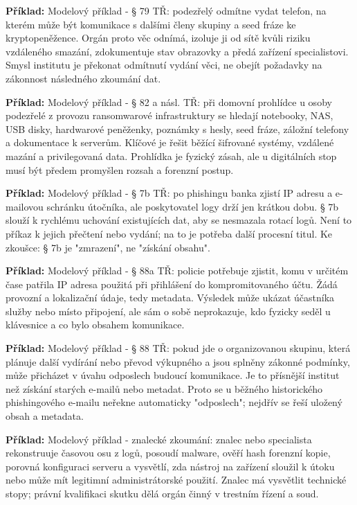 \documentclass[11pt,a4paper]{article}
\newcommand{\priklad}[1]{\begin{tcolorbox}[breakable,enhanced,colback=green!7,colframe=green!30!black,boxrule=0pt,arc=1mm,left=5pt,right=5pt,top=5pt,bottom=5pt,before skip=6pt,after skip=6pt]\textbf{Příklad:} #1\end{tcolorbox}}
\begin{document}
\priklad{Modelový příklad - § 79 TŘ: podezřelý odmítne vydat telefon, na kterém může být komunikace s dalšími členy skupiny a seed fráze ke kryptopeněžence. Orgán proto věc odnímá, izoluje ji od sítě kvůli riziku vzdáleného smazání, zdokumentuje stav obrazovky a předá zařízení specialistovi. Smysl institutu je překonat odmítnutí vydání věci, ne obejít požadavky na zákonnost následného zkoumání dat.}

\priklad{Modelový příklad - § 82 a násl. TŘ: při domovní prohlídce u osoby podezřelé z provozu ransomwarové infrastruktury se hledají notebooky, NAS, USB disky, hardwarové peněženky, poznámky s hesly, seed fráze, záložní telefony a dokumentace k serverům. Klíčové je řešit běžící šifrované systémy, vzdálené mazání a privilegovaná data. Prohlídka je fyzický zásah, ale u digitálních stop musí být předem promyšlen rozsah a forenzní postup.}

\priklad{Modelový příklad - § 7b TŘ: po phishingu banka zjistí IP adresu a e-mailovou schránku útočníka, ale poskytovatel logy drží jen krátkou dobu. § 7b slouží k rychlému uchování existujících dat, aby se nesmazala rotací logů. Není to příkaz k jejich přečtení nebo vydání; na to je potřeba další procesní titul. Ke zkoušce: § 7b je "zmrazení", ne "získání obsahu".}

\priklad{Modelový příklad - § 88a TŘ: policie potřebuje zjistit, komu v určitém čase patřila IP adresa použitá při přihlášení do kompromitovaného účtu. Žádá provozní a lokalizační údaje, tedy metadata. Výsledek může ukázat účastníka služby nebo místo připojení, ale sám o sobě neprokazuje, kdo fyzicky seděl u klávesnice a co bylo obsahem komunikace.}

\priklad{Modelový příklad - § 88 TŘ: pokud jde o organizovanou skupinu, která plánuje další vydírání nebo převod výkupného a jsou splněny zákonné podmínky, může přicházet v úvahu odposlech budoucí komunikace. Je to přísnější institut než získání starých e-mailů nebo metadat. Proto se u běžného historického phishingového e-mailu neřekne automaticky "odposlech"; nejdřív se řeší uložený obsah a metadata.}

\priklad{Modelový příklad - znalecké zkoumání: znalec nebo specialista rekonstruuje časovou osu z logů, posoudí malware, ověří hash forenzní kopie, porovná konfiguraci serveru a vysvětlí, zda nástroj na zařízení sloužil k útoku nebo může mít legitimní administrátorské použití. Znalec má vysvětlit technické stopy; právní kvalifikaci skutku dělá orgán činný v trestním řízení a soud.}
\end{document}
